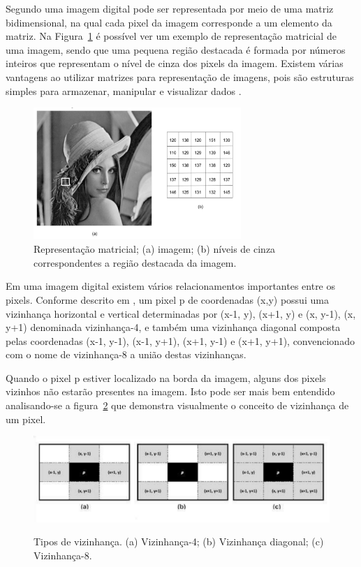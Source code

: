 Segundo  uma imagem digital pode ser representada por meio de uma matriz bidimensional, na qual cada pixel da imagem corresponde a um elemento da matriz. Na Figura~\ref{fig:imagem6} é possível ver um exemplo de representação matricial de uma imagem, sendo que uma pequena região destacada é formada por números inteiros que representam o nível de cinza dos pixels da imagem. Existem várias vantagens ao utilizar matrizes para representação de imagens, pois são estruturas simples para armazenar, manipular e visualizar dados \cite{PEDRINI2008}. 

 \begin{figure}[h!]
	\centering
	\includegraphics[width=0.7\textwidth]{Imagens/imagem6} 
	\caption[Representação matricial;]{Representação matricial; (a) imagem; (b) níveis de cinza correspondentes a região
destacada da imagem.}
	\label{fig:imagem6}
\end{figure}


Em uma imagem digital existem vários relacionamentos importantes entre os pixels. Conforme descrito em , 
um pixel p de coordenadas (x,y) possui uma vizinhança horizontal e vertical determinadas por (x-1, y), (x+1, y) e (x, y-1), (x, y+1) denominada vizinhança-4, e também uma vizinhança diagonal composta pelas coordenadas (x-1, y-1), (x-1, y+1), (x+1, y-1) e (x+1, y+1), convencionado com o nome de vizinhança-8 a união destas vizinhanças.


Quando o pixel p estiver localizado na borda da imagem, alguns dos pixels vizinhos não estarão presentes na imagem. Isto pode ser mais bem entendido analisando-se a figura~\ref{fig:imagem3} que demonstra visualmente o conceito de vizinhança de um pixel.

 \begin{figure}[h]
	\centering
	\includegraphics[width=1.0\textwidth]{Imagens/imagem3} %
	\caption[Texto que vai aparecer na lista de fig.]{Tipos de vizinhança. (a) Vizinhança-4; (b) Vizinhança diagonal; (c) Vizinhança-8. }
	\label{fig:imagem3}
\end{figure}

